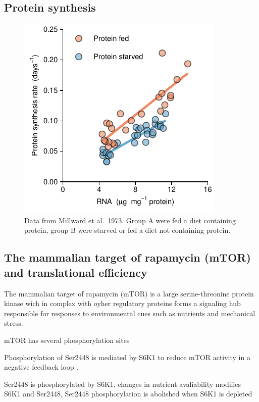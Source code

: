 \documentclass[twoside,10pt]{gihclass} %
\begin{document}
\hypertarget{protein-synthesis}{%
\subsection{Protein synthesis}\label{protein-synthesis}}
\begin{figure}
\centering
\includegraphics{thesis_files/figure-latex/Millward1973-1.pdf}
\caption{\label{fig:Millward1973}Data from Millward et al.~1973. Group A were fed a diet containing protein, group B were starved or fed a diet not containing protein.}
\end{figure}
\hypertarget{the-mammalian-target-of-rapamycin-mtor-and-translational-efficiency}{%
\subsection{The mammalian target of rapamycin (mTOR) and translational efficiency}\label{the-mammalian-target-of-rapamycin-mtor-and-translational-efficiency}}

The mammalian target of rapamycin (mTOR) is a large serine-threonine protein kinase wich in complex with oyher regulatory proteins forms a signaling hub responsible for responses to environmental cues such as nutrients and mechanical stress.

mTOR has several phosphorylation sites

Phosphorylation of Ser2448 is mediated by S6K1 to reduce mTOR activity in a negative feedback loop .

Ser2448 is phosphorylated by S6K1, changes in nutrient avaliability modifies S6K1 and Ser2448, Ser2448 phosphorylation is abolished when S6K1 is depleted
\end{document}
